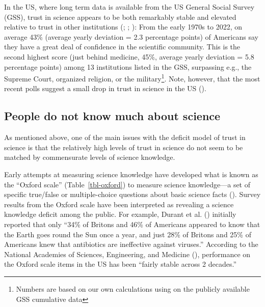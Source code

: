 \documentclass[
  jou,
  floatsintext,
  longtable,
  nolmodern,
  notxfonts,
  notimes,
  colorlinks=true,linkcolor=blue,citecolor=blue,urlcolor=blue]{apa7}
\begin{document}
In the US, where long term data is available from the US General Social
Survey (GSS), trust in science appears to be both remarkably stable and
elevated relative to trust in other institutions
(;
; ): From the early 1970s to 2022, on average 43\% (average yearly
deviation = 2.3 percentage points) of Americans say they have a great
deal of confidence in the scientific community. This is the second
highest score (just behind medicine, 45\%, average yearly deviation =
5.8 percentage points) among 13 institutions listed in the GSS,
surpassing e.g., the Supreme Court, organized religion, or the
military\footnote{Numbers are based on our own calculations using on the
  publicly available GSS cumulative data}. Note, however, that the most
recent polls suggest a small drop in trust in science in the US
().

\subsection{People do not know much about
science}\label{people-do-not-know-much-about-science}

As mentioned above, one of the main issues with the deficit model of
trust in science is that the relatively high levels of trust in science
do not seem to be matched by commensurate levels of science knowledge.

Early attempts at measuring science knowledge have developed what is
known as the ``Oxford scale'' (Table~\ref{tbl-oxford}) to measure
science knowledge---a set of specific true/false or multiple-choice
questions about basic science facts
(). Survey results
from the Oxford scale have been interpreted as revealing a science
knowledge deficit among the public. For example, Durant et al.
()
initially reported that only ``34\% of Britons and 46\% of Americans
appeared to know that the Earth goes round the Sun once a year, and just
28\% of Britons and 25\% of Americans knew that antibiotics are
ineffective against viruses.'' According to the National Academies of
Sciences, Engineering, and Medicine
(), performance on the Oxford scale items in the US has been
``fairly stable across 2 decades.''
\end{document}
